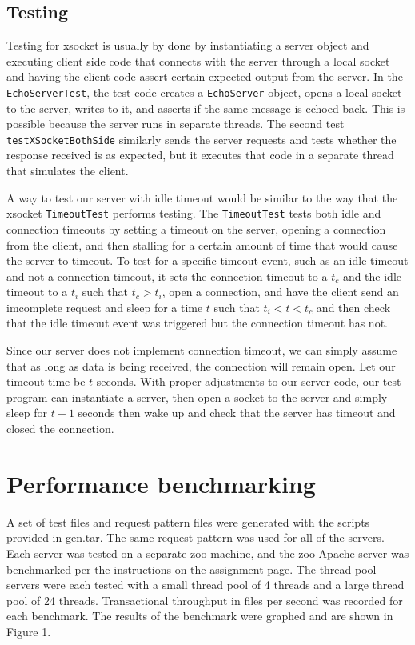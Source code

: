 \documentclass[letterpaper,12pt]{article}
\begin{document}
\subsection{Testing}

Testing for xsocket is usually by done by instantiating a server object and executing client side code that connects with the server through a local socket and having the client code assert certain expected output from the server. In the \texttt{EchoServerTest}, the test code creates a \texttt{EchoServer} object, opens a local socket to the server, writes to it, and asserts if the same message is echoed back. This is possible because the server runs in separate threads. The second test \texttt{testXSocketBothSide} similarly sends the server requests and tests whether the response received is as expected, but it executes that code in a separate thread that simulates the client.

A way to test our server with idle timeout would be similar to the way that the xsocket \texttt{TimeoutTest} performs testing. The \texttt{TimeoutTest} tests both idle and connection timeouts by setting a timeout on the server, opening a connection from the client, and then stalling for a certain amount of time that would cause the server to timeout. To test for a specific timeout event, such as an idle timeout and not a connection timeout, it sets the connection timeout to a $t_c$ and the idle timeout to a $t_i$ such that $t_c > t_i$, open a connection, and have the client send an imcomplete request and sleep for a time $t$ such that $t_i < t < t_c$ and then check that the idle timeout event was triggered but the connection timeout has not.

Since our server does not implement connection timeout, we can simply assume that as long as data is being received, the connection will remain open. Let our timeout time be $t$ seconds. With proper adjustments to our server code, our test program can instantiate a server, then open a socket to the server and simply sleep for $t + 1$ seconds then wake up and check that the server has timeout and closed the connection.

\section{Performance benchmarking}

A set of test files and request pattern files were generated with the scripts provided in gen.tar. The same request pattern was used for all of the servers. Each server was tested on a separate zoo machine, and the zoo Apache server was benchmarked per the instructions on the assignment page. The thread pool servers were each tested with a small thread pool of 4 threads and a large thread pool of 24 threads. Transactional throughput in files per second was recorded for each benchmark. The results of the benchmark were graphed and are shown in Figure 1.
\end{document}
